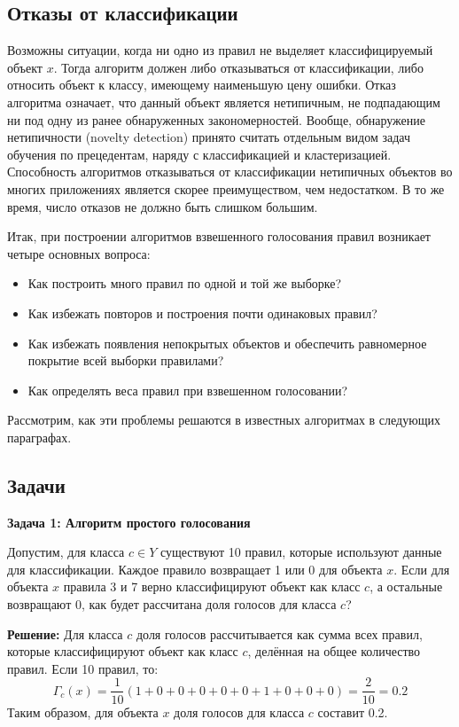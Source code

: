 \subsection{Отказы от классификации}
Возможны ситуации, когда ни одно из правил не выделяет классифицируемый объект $x$. Тогда алгоритм должен либо отказываться от классификации, либо относить объект к классу, имеющему наименьшую цену ошибки. Отказ алгоритма означает, что данный объект является нетипичным, не подпадающим ни под одну из ранее обнаруженных закономерностей. Вообще, обнаружение нетипичности (novelty detection) принято считать отдельным видом задач обучения по прецедентам, наряду с классификацией и кластеризацией. Способность алгоритмов отказываться от классификации нетипичных объектов во многих приложениях является скорее преимуществом, чем недостатком. В то же время, число отказов не должно быть слишком большим.

Итак, при построении алгоритмов взвешенного голосования правил возникает четыре основных вопроса:
\begin{itemize}
    \item Как построить много правил по одной и той же выборке?
    \item Как избежать повторов и построения почти одинаковых правил?
    \item Как избежать появления непокрытых объектов и обеспечить равномерное покрытие всей выборки правилами?
    \item Как определять веса правил при взвешенном голосовании?
\end{itemize}

Рассмотрим, как эти проблемы решаются в известных алгоритмах в следующих параграфах.

\subsection{Задачи}

\textbf{Задача 1: Алгоритм простого голосования}

Допустим, для класса $c \in Y$ существуют 10 правил, которые используют данные для классификации. Каждое правило возвращает 1 или 0 для объекта $x$. Если для объекта $x$ правила 3 и 7 верно классифицируют объект как класс $c$, а остальные возвращают 0, как будет рассчитана доля голосов для класса $c$?

\textbf{Решение:}  
Для класса $c$ доля голосов рассчитывается как сумма всех правил, которые классифицируют объект как класс $c$, делённая на общее количество правил. Если 10 правил, то:
\[
\Gamma_c(x) = \frac{1}{10} \left( 1 + 0 + 0 + 0 + 0 + 0 + 1 + 0 + 0 + 0 \right) = \frac{2}{10} = 0.2
\]
Таким образом, для объекта $x$ доля голосов для класса $c$ составит 0.2.

